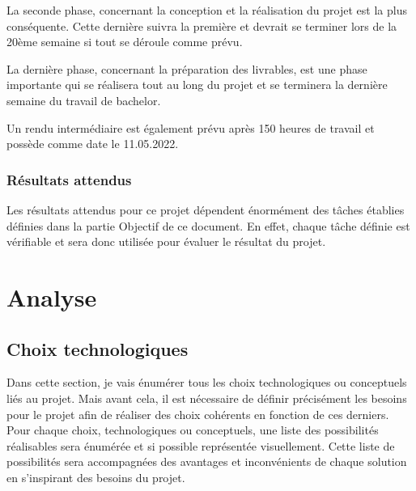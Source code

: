 \documentclass[
    iai, %
    il, %
]{heig-tb}
\begin{document}
La seconde phase, concernant la conception et la réalisation du projet est la plus conséquente.
Cette dernière suivra la première et devrait se terminer lors de la 20ème semaine si tout se déroule comme prévu.

La dernière phase, concernant la préparation des livrables, est une phase importante qui se réalisera tout au long du projet et se terminera la dernière semaine du travail de bachelor.

Un rendu intermédiaire est également prévu après 150 heures de travail et possède comme date le 11.05.2022.

\subsection{Résultats attendus}

Les résultats attendus pour ce projet dépendent énormément des tâches établies définies dans la partie Objectif de ce document.
En effet, chaque tâche définie est vérifiable et sera donc utilisée pour évaluer le résultat du projet.
\clearpage

\chapter{Analyse}

\section{Choix technologiques}

Dans cette section, je vais énumérer tous les choix technologiques ou conceptuels liés au projet.
Mais avant cela, il est nécessaire de définir précisément les besoins pour le projet afin de réaliser des choix cohérents en fonction de ces derniers.
Pour chaque choix, technologiques ou conceptuels, une liste des possibilités réalisables sera énumérée et si possible représentée visuellement.
Cette liste de possibilités sera accompagnées des avantages et inconvénients de chaque solution en s'inspirant des besoins du projet.
\end{document}
